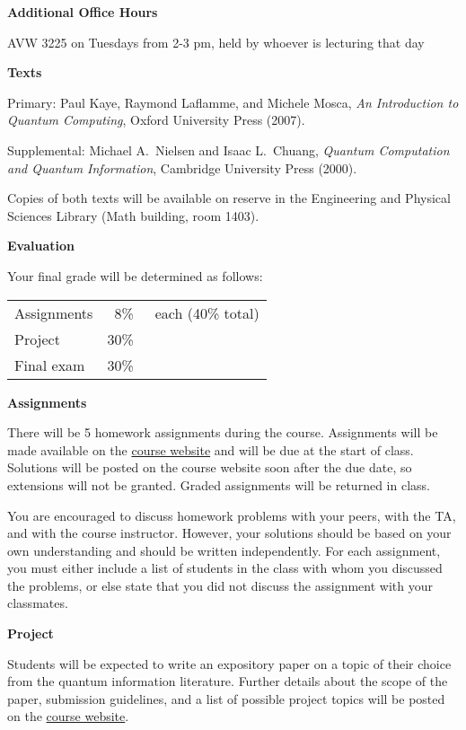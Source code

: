 \documentclass[11pt]{article}
\begin{document}
\medskip 

{\bf Additional Office Hours}

AVW 3225 on Tuesdays from 2-3 pm, held by whoever is lecturing that day

\newpage

{\bf Texts}

Primary: Paul Kaye, Raymond Laflamme, and Michele Mosca, \emph{An Introduction to Quantum Computing}, Oxford University Press (2007).

Supplemental: Michael A.\ Nielsen and Isaac L.\ Chuang, \emph{Quantum Computation and Quantum Information}, Cambridge University Press (2000).

Copies of both texts will be available on reserve in the Engineering and Physical Sciences Library (Math building, room 1403).

\medskip

{\bf Evaluation}

Your final grade will be determined as follows:

\begin{tabular}{@{}lr@{}l}
Assignments &  8\% & ~each (40\% total) \\
Project     & 30\% \\
Final exam  & 30\%

\end{tabular}

\medskip

{\bf Assignments}

There will be 5 homework assignments during the course.  Assignments will be made available on the \href{http://ter.ps/introqip}{course website} and will be due at the start of class.  Solutions will be posted on the course website soon after the due date, so extensions will not be granted.  Graded assignments will be returned in class.

You are encouraged to discuss homework problems with your peers, with the TA, and with the course instructor.  However, your solutions should be based on your own understanding and should be written independently.  For each assignment, you must either include a list of students in the class with whom you discussed the problems, or else state that you did not discuss the assignment with your classmates.

\medskip

{\bf Project}

Students will be expected to write an expository paper on a topic of their choice from the quantum information literature. Further details about the scope of the paper, submission guidelines, and a list of possible project topics will be posted on the \href{http://ter.ps/introqip}{course website}.
\end{document}
